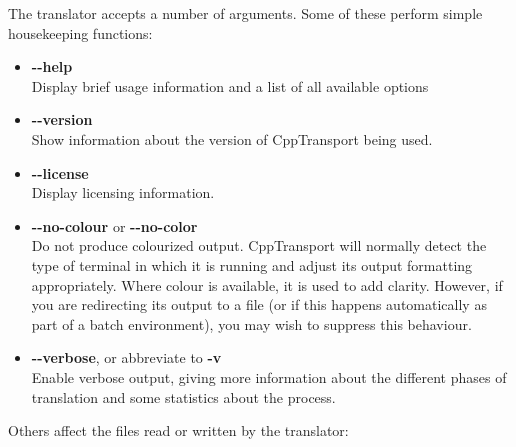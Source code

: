\documentclass[11pt,a4paper]{article}
\newcommand{\packagefont}{\sffamily}
\newcommand{\CppTransport}{{\packagefont CppTransport}}
\newcommand{\option}[1]{{\ttfamily\bfseries\small #1}}
\begin{document}
The translator accepts a number of arguments.
Some of these perform simple housekeeping functions:
\begin{itemize}
    \item \option{{-}{-}help} \\
    Display brief usage information and a list of all
    available options
    
    \item \option{{-}{-}version} \\
    Show information about the version of {\CppTransport} being used.
    
    \item \option{{-}{-}license} \\
    Display licensing information.
    
    \item \option{{-}{-}no-colour} or \option{{-}{-}no-color} \\
    Do not produce colourized output. {\CppTransport} will normally detect
    the type of terminal in which it is running and adjust its
    output formatting appropriately. Where colour is available, it is used
    to add clarity.
    However, if you are redirecting its output to a file
    (or if this happens automatically as part of a batch
    environment), you may wish to suppress this behaviour.
    
    \item \option{{-}{-}verbose}, or abbreviate to \option{-v} \\
    Enable verbose output, giving more information about the different
    phases of translation and some statistics about
    the process.
\end{itemize}
Others affect the files read or written by the translator:
\end{document}
